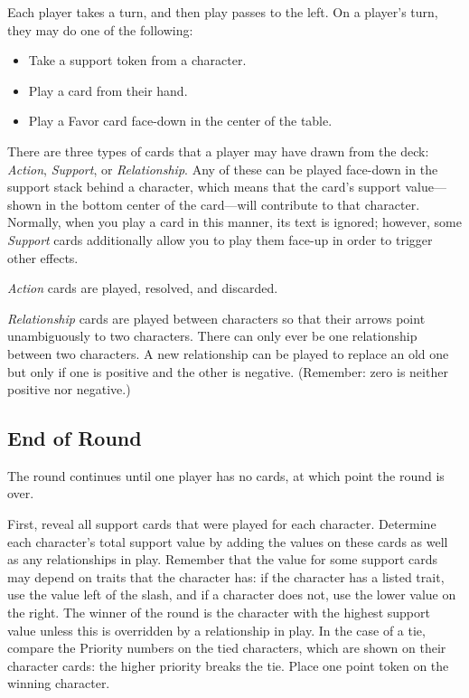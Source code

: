 \documentclass{article}
\begin{document}
Each player takes a turn, and then play passes to the left.
On a player's turn, they may do one of the following:
\begin{itemize}
\item Take a support token from a character. 
\item Play a card from their hand.
\item Play a Favor card face-down in the center of the table.
\end{itemize}

There are three types of cards that a player may have drawn from the
deck: \textit{Action}, \textit{Support}, or \textit{Relationship}.
Any of these can be played face-down in the support stack behind a
character, which means that the card's support value---shown in the
bottom center of the card---will contribute to that character.
Normally, when you play a card in this manner, its text is ignored;
however, some
\textit{Support} cards additionally allow you to play them face-up in
order to trigger other effects.

\textit{Action} cards are played, resolved, and discarded.

\textit{Relationship} cards are played between characters so that their
arrows point unambiguously to two characters. There can only ever
be one relationship between two characters. A new relationship can be
played to replace an old one but only if one is positive and the
other is negative. (Remember: zero is neither positive nor negative.)

\subsection*{End of Round}

The round continues until one player has no cards, at which point
the round is over.

First, reveal all support cards that were played for each character.
Determine each character's total support value by adding the
values on these cards as well as any relationships in play.
Remember that the value for some support cards may depend on
traits that the character has: if the character has a listed trait,
use the value left of the slash, and if a character does not, use
the lower value on the right.
The winner of the round is the character with the highest support
value unless this is overridden by a relationship in play.
In the case of a tie, compare the Priority numbers on the
tied characters, which are shown on their character cards:
the higher priority breaks the tie.
Place one point token on the winning character.
\end{document}
